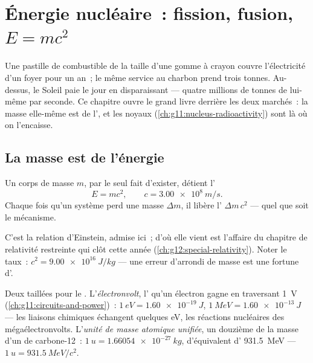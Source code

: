 \chapter{Énergie nucléaire~: fission, fusion, $E=mc^2$}\label{ch:g12:nuclear-energy}

Une pastille de combustible de la taille d'une gomme à crayon couvre
l'électricité d'un foyer pour un an~; le même service au charbon
prend trois tonnes. Au-dessus, le Soleil paie le jour en disparaissant
--- quatre millions de tonnes de lui-même par seconde. Ce chapitre
ouvre le grand livre derrière les deux marchés~: la masse elle-même
est de l', et les noyaux
(\cref{ch:g11:nucleus-radioactivity}) sont là où on l'encaisse.

\section{La masse est de l'énergie}

\begin{theorem}\label{thm:g12:nuclear-energy:emc2}
Un corps de masse $m$, par le seul fait d'exister, détient
l'
\[
E = m c^2, \qquad c = \qty{3.00e8}{m/s}.
\]
Chaque fois qu'un système perd une masse $\Delta m$, il libère
l' $\Delta m\, c^2$ --- quel que soit le
mécanisme.
\end{theorem}
\admitted

\begin{remark}[Einstein, 1905]\label{rem:g12:nuclear-energy:einstein}
C'est la relation d'Einstein, admise ici~; d'où elle vient est
l'affaire du chapitre de relativité restreinte qui clôt cette année
(\cref{ch:g12:special-relativity}). Noter le taux~:
$c^2 = \qty{9.00e16}{J/kg}$ --- une erreur d'arrondi de masse est une
fortune d'.
\end{remark}

\begin{definition}\label{def:g12:nuclear-energy:units}
Deux  taillées pour le
. L'\emph{électronvolt},
l' qu'un électron gagne en traversant
\qty{1}{V} (\cref{ch:g11:circuits-and-power})~:
$\qty{1}{eV} = \qty{1.60e-19}{J}$, $\qty{1}{MeV} = \qty{1.60e-13}{J}$
--- les liaisons chimiques échangent quelques \unit{eV}, les réactions
nucléaires des mégaélectronvolts. L'\emph{unité de
masse atomique unifiée}, un
douzième de la masse d'un  de
carbone-12~: $\qty{1}{u} = \qty{1.66054e-27}{kg}$, d'équivalent
d' \qty{931.5}{MeV} ---
$\qty{1}{u} = \qty{931.5}{MeV}/c^2$.
\end{definition}

